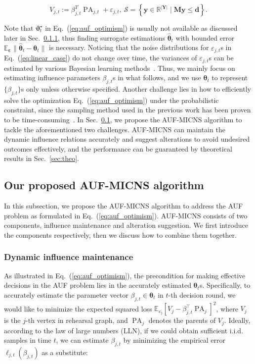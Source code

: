 \documentclass{article}
\theoremstyle{plain}
\theoremstyle{definition}
\theoremstyle{remark}
\def \Eq {Eq.}
\def \Sec {Sec.}
\def \PA {\operatorname{PA}}
\begin{document}
\vskip -0.1in
\begin{equation}
  \label{eq:linear_case}
  V_{j, t} := \beta_{j, t}^T \PA_{j, t}+\varepsilon_{j, t},\ \mathcal{S}=\left\{\mathbf{y} \in \mathbb{R}^{|\mathbf{Y}|} \mid \mathbf{M y} \leq \mathbf{d}\right\}.
\end{equation}


Note that $\bm{\vartheta}_t^\star$ in \Eq~(\ref{eq:auf_optimism}) is usually not available as discussed later in \Sec~\ref{sec:online}, 
thus finding surrogate estimations $\hat{\bm{\theta}}_t$ with bounded error $\mathbb{E}_{\bm{\varepsilon}}\|\hat{\bm{\theta}}_t-\bm{\theta}_t\|$ is necessary. 
Noticing that the noise distributions for $\varepsilon_{j,t}$s in \Eq~(\ref{eq:linear_case}) do not change over time, the variances of  $\varepsilon_{j,t}$s can be estimated by various Bayesian learning methods~\citep{bishop2006pmlr}. 
Thus, we mainly focus on estimating influence parameters $\beta_{j,t}$s in what follows, and we use $\bm{\theta}_t$ to represent $\{\beta_{j,t}\}$s only unless otherwise specified. 
Another challenge lies in how to efficiently solve the optimization \Eq~(\ref{eq:auf_optimism}) under the probabilistic constraint, 
since the sampling method used in the previous work has been proven to be time-consuming~\citep{qint2023srm}. 
In \Sec~\ref{sec:micns}, we propose the AUF-MICNS algorithm to tackle the aforementioned two challenges. 
AUF-MICNS can maintain the dynamic influence relations accurately and suggest alterations to avoid undesired outcomes effectively, 
and the performance can be guaranteed by theoretical results in \Sec~\ref{sec:theo}. 

\vskip -0.1in


\subsection{Our proposed AUF-MICNS algorithm}
\label{sec:micns}


In this subsection, we propose the AUF-MICNS algorithm to address the AUF problem as formulated in \Eq~(\ref{eq:auf_optimism}). 
AUF-MICNS consists of two components, influence maintenance and alteration suggestion.
We first introduce the components respectively, then we discuss how to combine them together.

\subsubsection{Dynamic influence maintenance}
\label{sec:online}
As illustrated in \Eq~(\ref{eq:auf_optimism}), the precondition for making effective decisions in the AUF problem lies in the accurately estimated $\bm{\theta}_t$s. 
Specifically, to accurately estimate the parameter vector $\beta_{j, t}\in \bm{\theta}_t$ in $t$-th decision round, we would like to minimize the expected squared loss $ \mathbb{E}_{\varepsilon_j}\left[V_{j} - \beta^\top_{j, t} \PA_j\right]^2$,  
where $V_{j}$ is the $j$-th vertex in rehearsal graph, and $\PA_j$ denotes the parents of $V_{j}$.
Ideally, according to the law of large numbers (LLN), if we could obtain sufficient i.i.d. samples in time $t$, we can estimate $\beta_{j, t}$ by minimizing the empirical error $\ell_{j, t}(\beta_{j, t})$ as a substitute: 
\end{document}
